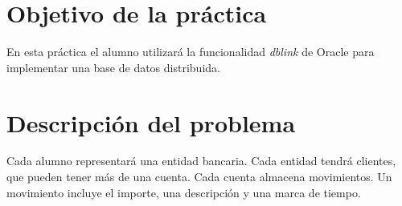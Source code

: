 
\usepackage{eurosym}
\usepackage{needspace}




\renewcommand{\hmwkTitle}{Práctica DBLinks (simplificada)}
\renewcommand{\hmwkClass}{Bases de datos}

\usepackage{blindtext}






\primerapagina

\setlength{\parindent}{1em}
\setlength{\parskip}{1em}

\section{Objetivo de la práctica}
En esta práctica el alumno utilizará la funcionalidad \textit{dblink} de Oracle para implementar una base de datos distribuida.



\section{Descripción del problema}
Cada alumno representará una entidad bancaria. Cada entidad tendrá clientes, que pueden tener más de una cuenta.
Cada cuenta almacena movimientos. Un movimiento incluye el importe, una descripción y una marca de tiempo.


